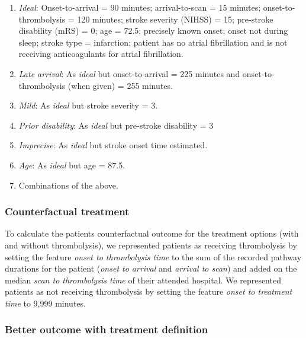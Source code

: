 \begin{enumerate}
    \item \textit{Ideal}: Onset-to-arrival = 90 minutes; arrival-to-scan = 15 minutes; onset-to-thrombolysis = 120 minutes; stroke severity (NIHSS) = 15; pre-stroke disability (mRS) = 0; age = 72.5; precisely known onset; onset not during sleep; stroke type = infarction; patient has no atrial fibrillation and is not receiving anticoagulants for atrial fibrillation.

    \item \textit{Late arrival}: As \textit{ideal} but onset-to-arrival = 225 minutes and onset-to-thrombolysis (when given) = 255 minutes.

    \item \textit{Mild}: As \textit{ideal} but stroke severity = 3.

    \item \textit{Prior disability}: As \textit{ideal} but pre-stroke disability = 3

    \item \textit{Imprecise}: As \textit{ideal} but stroke onset time estimated.

    \item \textit{Age}: As \textit{ideal} but age = 87.5.

    \item Combinations of the above.
\end{enumerate}


\subsubsection{Counterfactual treatment}

To calculate the patients counterfactual outcome for the treatment options (with and without thrombolysis), we represented patients as receiving thrombolysis by setting the feature \textit{onset to thrombolysis time} to the sum of the recorded pathway durations for the patient (\textit{onset to arrival} and \textit{arrival to scan}) and added on the median \textit{scan to thrombolysis time} of their attended hospital. We represented patients as not receiving thrombolysis by setting the feature \textit{onset to treatment time} to 9,999 minutes.

\subsubsection{Better outcome with treatment definition}

